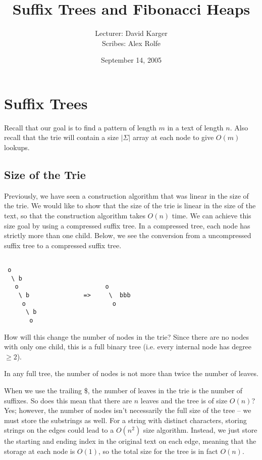 \documentclass{article}
\begin{document}
\title{Suffix Trees and Fibonacci Heaps}
\date{September 14, 2005}
\author{Lecturer: David Karger\\ Scribes: Alex Rolfe}

\section{Suffix Trees}

Recall that our goal is to find a pattern of length $m$ in a text of
length $n$.  Also recall that the trie will contain a size $|\Sigma|$
array at each node to give $O(m)$ lookups.

\subsection{Size of the Trie}

Previously, we have seen a construction algorithm that was linear in
the size of the trie.  We would like to show that the size of the trie
is linear in the size of the text, so that the construction algorithm
takes $O(n)$ time.  We can achieve this size goal by using a
compressed suffix tree.  In a compressed tree, each node has strictly
more than one child.  Below, we see the conversion from a uncompressed
suffix tree to a compressed suffix tree.

\begin{verbatim}

 o
  \ b
   o                        o
    \ b               =>     \  bbb
     o                        o
      \ b
       o
\end{verbatim}

How will this change the number of nodes in the trie?  Since there are
no nodes with only one child, this is a full binary tree (i.e. every
internal node has degree $\geq 2$).

\begin{lemma}
In any full tree, the number of nodes is not more than twice the number
of leaves.
\end{lemma}

When we use the trailing \$, the number of leaves in the trie is the
number of suffixes.  So does this mean that there are $n$ leaves and
the tree is of size $O(n)$?  Yes; however, the number of nodes isn't
necessarily the full size of the tree -- we must store the substrings
as well.  For a string with distinct characters, storing strings on
the edges could lead to a $O(n^2)$ size algorithm.  Instead, we just
store the starting and ending index in the original text on each edge,
meaning that the storage at each node is $O(1)$, so the total size for
the tree is in fact $O(n)$.
\end{document}
